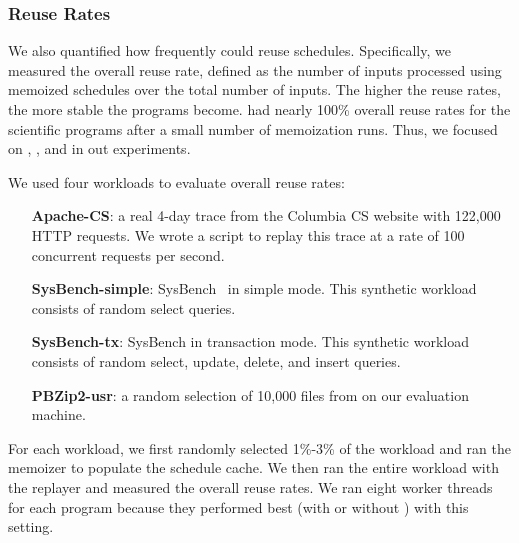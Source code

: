 \subsubsection{Reuse Rates} \label{sec:tern-reuse-rate}

We also quantified how frequently \tern could reuse schedules.
Specifically, we measured the overall reuse rate, defined as the number of
inputs processed using memoized schedules over the total number of inputs.
The higher the reuse rates, the more stable the programs become.  \tern had
nearly 100\% overall reuse rates for the scientific programs after a small
number of memoization runs.  Thus, we focused on \apache, \mysql, and \pbzip
in out experiments.

We used four workloads to evaluate overall reuse rates:

\begin{enumerate}

\item[{\bf Apache-CS}:] a real 4-day trace from the Columbia CS website
  with 122,000 HTTP requests.  We wrote a script to replay this trace at a
  rate of 100 concurrent requests per second.

\item[{\bf SysBench-simple}:] SysBench~\cite{sysbench} in simple mode.  This
  synthetic workload consists of random select queries.


\item[{\bf SysBench-tx}:] SysBench in transaction mode.  This synthetic
  workload consists of random select, update, delete, and insert queries.

\item[{\bf PBZip2-usr}:] a random selection of 10,000 files from 
  on our evaluation machine.

\end{enumerate}

For each workload, we first randomly selected 1\%-3\% of the workload and
ran the memoizer to populate the schedule cache.  We then ran the entire
workload with the replayer and measured the overall reuse rates.  We ran
eight worker threads for each program because they performed best (with or
without \tern) with this setting.

